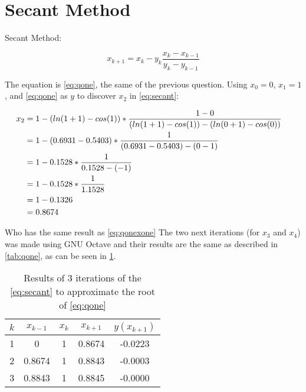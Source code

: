 \section{Secant Method}

	Secant Method:
	
	\begin{equation}
		x_{k+1} = x_{k} - y_{k}\frac{x_{k}-x_{k-1}}{y_{k}-y_{k-1}}
	\label{eq:secant}
	\end{equation}
	
	The equation is \cref{eq:qone}, the same of the previous question. Using $x_{0} = 0$, $x_{1} = 1$, and \cref{eq:qone} as $y$ to discover $x_{2}$ in \cref{eq:secant}:
	
	\begin{align}
		x_{2} &= 1 - \left( ln(1+1) - cos(1) \right)*\frac{1-0}{\left( ln(1+1) - cos(1) \right) - \left( ln(0+1) - cos(0) \right)}& \notag \\
		&= 1 - \left( 0.6931 - 0.5403 \right)*\frac{1}{\left( 0.6931 - 0.5403 \right) - \left( 0 - 1 \right)}& \notag \\
		&= 1 - 0.1528*\frac{1}{0.1528 - (-1)}& \notag \\
		&= 1 - 0.1528 *\frac{1}{1.1528}& \notag \\
		&= 1 - 0.1326& \notag \\
		&= 0.8674&
		\label{eq:qtwoxtwo}
	\end{align}

	Who has the same result as \cref{eq:qonexone}
	The two next iterations (for $x_{3}$ and $x_{4}$) was made using GNU Octave and their results are the same as described in \cref{tab:qone}, as can be seen in \cref{tab:qtwo}.

	\begin{table}[H]
		\begin{center}
			\begin{tabular}{|c||c|c||c|c|}
				\hline
				\textbf{$k$} & \textbf{$x_{k-1}$} & \textbf{$x_{k}$} & \textbf{$x_{k+1}$} & \textbf{$y(x_{k+1})$} \\ \hline
				1 & 0 & 1 & 0.8674 & -0.0223 \\ \hline
				2 & 0.8674 & 1 & 0.8843 & -0.0003 \\ \hline
				3 & 0.8843 & 1 & 0.8845 & -0.0000 \\ \hline
			\end{tabular}
			\caption{Results of 3 iterations of the \cref{eq:secant} to approximate the root of \cref{eq:qone}}
			\label{tab:qtwo}
		\end{center}
	\end{table}